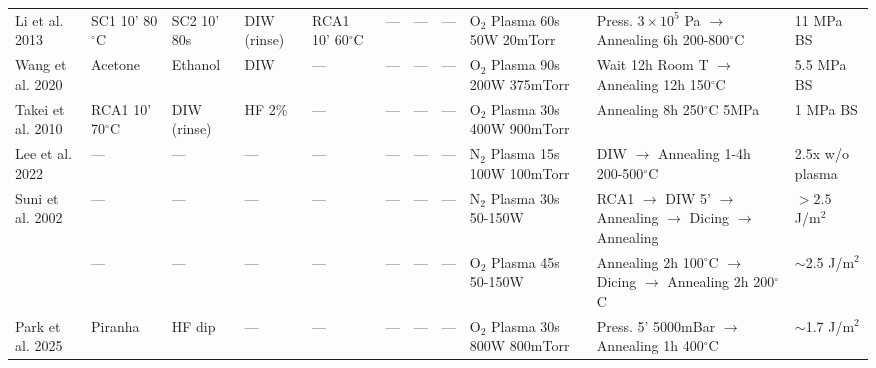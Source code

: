 \begin{landscape}
\begin{table}[p]
{\begin{tabular}{l l l l l l l l l l l}
\addlinespace
Li et al. 2013 \cite{li2013}
    & SC1 10' 80$^\circ$C & SC2 10' 80s & DIW (rinse) & RCA1 10' 60$^\circ$C & --- & --- & --- & O$_2$ Plasma 60s 50W 20mTorr & Press. $3 \times 10^5$ Pa $\rightarrow$ Annealing 6h 200-800$^\circ$C & 11 MPa BS \\
\addlinespace
Wang et al. 2020 \cite{wang2020}
    & Acetone & Ethanol & DIW & --- & --- & --- & --- & O$_2$ Plasma 90s 200W 375mTorr & Wait 12h Room T $\rightarrow$ Annealing 12h 150$^\circ$C & 5.5 MPa BS \\
\addlinespace
Takei et al. 2010 \cite{takei2010}
    & RCA1 10' 70$^\circ$C & DIW (rinse) & HF 2\% & --- & --- & --- & --- & O$_2$ Plasma 30s 400W 900mTorr & Annealing 8h 250$^\circ$C 5MPa & 1 MPa BS \\
\addlinespace
Lee et al. 2022 \cite{lee2022}
    & --- & --- & --- & --- & --- & --- & --- & N$_2$ Plasma 15s 100W 100mTorr & DIW $\rightarrow$ Annealing 1-4h 200-500$^\circ$C & 2.5x w/o plasma \\
\addlinespace
Suni et al. 2002 \cite{suni2002}
    & --- & --- & --- & --- & --- & --- & --- & N$_2$ Plasma 30s 50-150W & RCA1 $\rightarrow$ DIW 5' $\rightarrow$ Annealing $\rightarrow$ Dicing $\rightarrow$ Annealing & $> 2.5$ J/m$^2$ \\
    & --- & --- & --- & --- & --- & --- & --- & O$_2$ Plasma 45s 50-150W & Annealing 2h 100$^\circ$C $\rightarrow$ Dicing $\rightarrow$ Annealing 2h 200$^\circ$C & $\sim$2.5 J/m$^2$ \\
\addlinespace
Park et al. 2025 \cite{park2025}
    & Piranha & HF dip & --- & --- & --- & --- & --- & O$_2$ Plasma 30s 800W 800mTorr & Press. 5' 5000mBar $\rightarrow$ Annealing 1h 400$^\circ$C & $\sim$1.7 J/m$^2$ \\
\bottomrule
\end{tabular}%
}
\end{table}
\end{landscape}